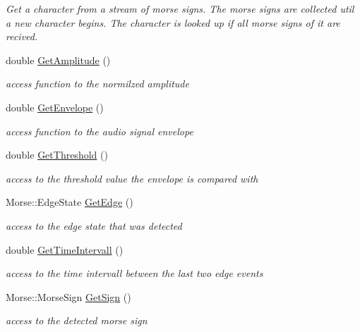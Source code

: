 \begin{DoxyCompactItemize}
\begin{DoxyCompactList}\small\item\em Get a character from a stream of morse signs. The morse signs are collected util a new character begins. The character is looked up if all morse signs of it are recived. \end{DoxyCompactList}\item 
double \hyperlink{classMorseDecode_a610be58591f00c28eb624f062115ce82}{Get\+Amplitude} ()
\begin{DoxyCompactList}\small\item\em access function to the normilzed amplitude \end{DoxyCompactList}\item 
double \hyperlink{classMorseDecode_adc01798960f0f74071eaac3516a4b523}{Get\+Envelope} ()
\begin{DoxyCompactList}\small\item\em access function to the audio signal envelope \end{DoxyCompactList}\item 
double \hyperlink{classMorseDecode_a293ca5977883ebbd4266827491ddeae9}{Get\+Threshold} ()
\begin{DoxyCompactList}\small\item\em access to the threshold value the envelope is compared with \end{DoxyCompactList}\item 
Morse\+::\+Edge\+State \hyperlink{classMorseDecode_a92f19fd07b401876cf132f5f134f2788}{Get\+Edge} ()
\begin{DoxyCompactList}\small\item\em access to the edge state that was detected \end{DoxyCompactList}\item 
double \hyperlink{classMorseDecode_acdc50282bee5f2893d3aeb1210b47ca7}{Get\+Time\+Intervall} ()
\begin{DoxyCompactList}\small\item\em access to the time intervall between the last two edge events \end{DoxyCompactList}\item 
Morse\+::\+Morse\+Sign \hyperlink{classMorseDecode_aae2b17a7fc829a84f2cbc2c9a1577a18}{Get\+Sign} ()
\begin{DoxyCompactList}\small\item\em access to the detected morse sign \end{DoxyCompactList}\item 

\end{DoxyCompactItemize}
